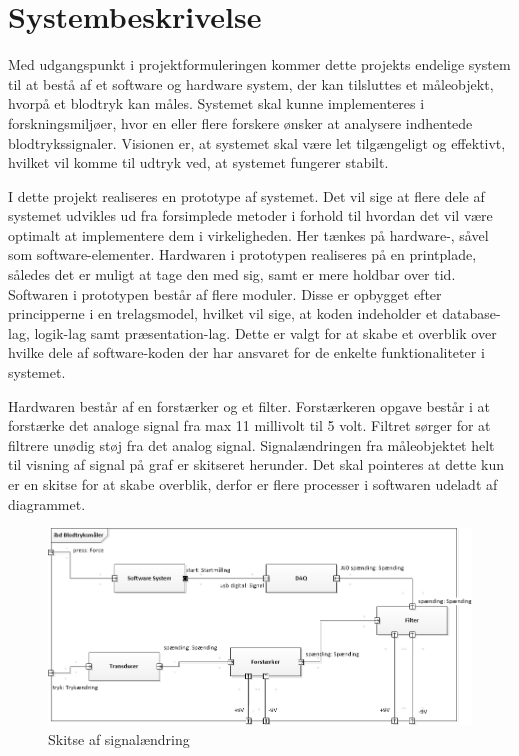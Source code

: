 \chapter{Systembeskrivelse}
Med udgangspunkt i projektformuleringen kommer dette projekts endelige system til at bestå af et software og hardware system, der kan tilsluttes et måleobjekt, hvorpå et blodtryk kan måles. Systemet skal kunne implementeres i forskningsmiljøer, hvor en eller flere forskere ønsker at analysere indhentede blodtrykssignaler. Visionen er, at systemet skal være let tilgængeligt og effektivt, hvilket vil komme til udtryk ved, at systemet fungerer stabilt.

I dette projekt realiseres en prototype af systemet. Det vil sige at flere dele af systemet udvikles ud fra forsimplede metoder i forhold til hvordan det vil være optimalt at implementere dem i virkeligheden. Her tænkes på hardware-, såvel som software-elementer. Hardwaren i prototypen realiseres på en printplade, således det er muligt at tage den med sig, samt er mere holdbar over tid. Softwaren i prototypen består af flere moduler. Disse er opbygget efter principperne i en trelagsmodel, hvilket vil sige, at koden indeholder et database-lag, logik-lag samt præsentation-lag. Dette er valgt for at skabe et overblik over hvilke dele af software-koden der har ansvaret for de enkelte funktionaliteter i systemet.

Hardwaren består af en forstærker og et filter. Forstærkeren opgave består i at forstærke det analoge signal fra max 11 millivolt til 5 volt. Filtret sørger for at filtrere unødig støj fra det analog signal. Signalændringen fra måleobjektet helt til visning af signal på graf er skitseret herunder. Det skal pointeres at dette kun er en skitse for at skabe overblik, derfor er flere processer i softwaren udeladt af diagrammet. 

\begin{figure}[htb]
	\centering
	\includegraphics[width=1.0\textwidth]{Figurer/IBD}
	\caption{Skitse af signalændring}
\end{figure}

